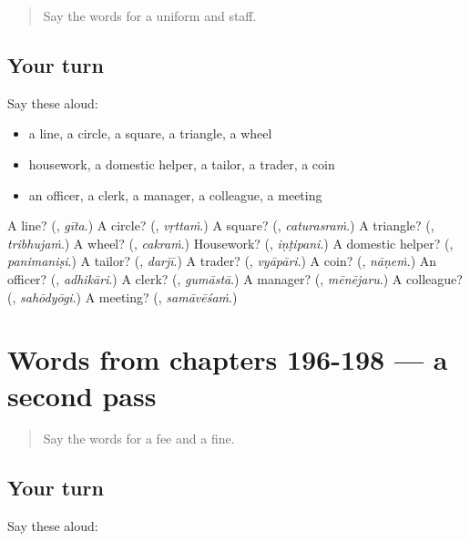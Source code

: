 \begin{quote}
Say the words for a uniform and staff.
\end{quote}

\subsection*{Your turn}
Say these aloud:

\begin{itemize}
\raggedright
  \item a line, a circle, a square, a triangle, a wheel
  \item housework, a domestic helper, a tailor, a trader, a coin
  \item an officer, a clerk, a manager, a colleague, a meeting
\end{itemize}

\begin{tcolorbox}[breakable,colback=teal!4,colframe=teal!35!black,title={Before you move on}]
A line? (\textbf{}, \emph{gīta}.) A circle? (\textbf{}, \emph{vṛttaṁ}.) A square? (\textbf{}, \emph{caturasraṁ}.) A triangle? (\textbf{}, \emph{tribhujaṁ}.) A wheel? (\textbf{}, \emph{cakraṁ}.) Housework? (\textbf{}, \emph{iṇṭipani}.) A domestic helper? (\textbf{}, \emph{panimaniṣi}.) A tailor? (\textbf{}, \emph{darjī}.) A trader? (\textbf{}, \emph{vyāpāri}.) A coin? (\textbf{}, \emph{nāṇeṁ}.) An officer? (\textbf{}, \emph{adhikāri}.) A clerk? (\textbf{}, \emph{gumāstā}.) A manager? (\textbf{}, \emph{mēnējaru}.) A colleague? (\textbf{}, \emph{sahōdyōgi}.) A meeting? (\textbf{}, \emph{samāvēśaṁ}.)
\end{tcolorbox}
\section[(dialogue)]{Words from chapters 196-198 — a second pass}

\label{lesson:TE-R198-second-pass-words-from-chapters-196-198}



\begin{quote}
Say the words for a fee and a fine.
\end{quote}

\subsection*{Your turn}
Say these aloud:

